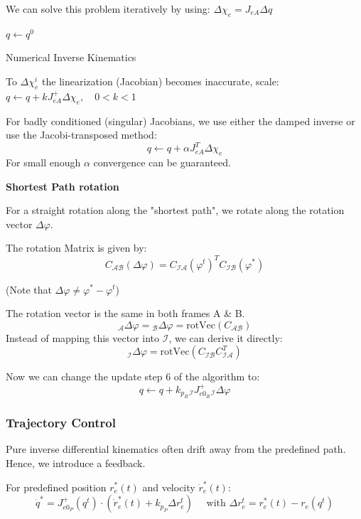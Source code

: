 \documentclass[fontsize=6pt,DIV=calc,a4paper,ngerman]{scrartcl}
\begin{document}
\begin{multicols*}{4}
	\smallskip
	We can solve this problem iteratively by using: $\Delta\chi_e = J_{eA}\Delta q$
	\begin{algorithm}[H]
		\small
		\SetAlgoLined
		$q \leftarrow q^0$ 
		\caption{Numerical Inverse Kinematics}
	\end{algorithm}

	To $\Delta\chi_e^i$ the linearization (Jacobian) becomes inaccurate, scale:
	$q \leftarrow q + kJ_{eA}^+ \Delta\chi_e ,\quad 0<k<1$

	\smallskip
	For badly conditioned (singular) Jacobians, we use either the damped inverse or use the Jacobi-transposed method:
	$$q \leftarrow q + \alpha J_{eA}^T \Delta\chi_e$$
	For small enough $\alpha$ convergence can be guaranteed.

	\smallskip
	\textbf{Shortest Path rotation}

	For a straight rotation along the "shortest path", we rotate along the rotation vector $\Delta \varphi$.

	The rotation Matrix is given by: $$C_\mathcal{AB}(\Delta\varphi)=C_\mathcal{IA}(\varphi^t)^TC_\mathcal{IB}(\varphi^*)$$
	\begin{flushright}(Note that $\Delta\varphi \neq \varphi^*-\varphi^t$)\end{flushright}
	The rotation vector is the same in both frames A \& B. $${}_\mathcal{A}\Delta\varphi = {}_\mathcal{B}\Delta\varphi = \text{rotVec}(C_\mathcal{AB})$$
	Instead of mapping this vector into $\mathcal{I}$, we can derive it directly:
	$${}_\mathcal{I}\Delta\varphi = \text{rotVec}(C_\mathcal{IB}C_\mathcal{IA}^T)$$

	Now we can change the update step 6 of the algorithm to:
	$$q \leftarrow q + k_{p_R}{}_\mathcal{I}J^+_{e0_R}{}_\mathcal{I}\Delta\varphi$$


	\subsubsection{Trajectory Control}
	Pure inverse differential kinematics often drift away from the predefined path. Hence, we introduce a feedback.

	For predefined position $r_e^*(t)$ and velocity $\dot{r}_e^*(t)$:
	$$\dot{q}^*= J_{e0_P}^+(q^t)\cdot (\dot{r}_e^*(t) + k_{p_P}\Delta r^t_e) \quad \text{ with } \Delta r^t_e = r^*_e(t) -r_e(q^t)$$


\end{multicols*}
\end{document}
